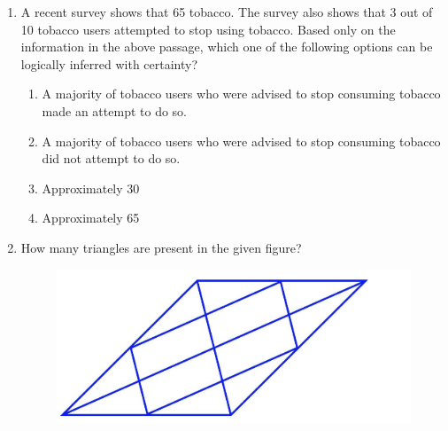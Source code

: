 \documentclass[12pt]{article}
\theoremstyle{remark}
\begin{document}
\begin{enumerate}
\begin{enumerate}
 \end{enumerate}
\hfill{}
\item A recent survey shows that 65%
tobacco. The survey also shows that 3 out of 10 tobacco users attempted to stop
using tobacco. 
Based only on the information in the above passage, which one of the following
options can be logically inferred with certainty? 
\begin{enumerate}
\item A majority of tobacco users who were advised to stop consuming tobacco made an
attempt to do so. 
\item A majority of tobacco users who were advised to stop consuming tobacco did not
attempt to do so. 
\item Approximately 30%
\item Approximately 65%
\end{enumerate}
\hfill{}
\newline
\item How many triangles are present in the given figure? 
\begin{centering}
\begin{figure}[H] 
\includegraphics{Figs/Q5.png}
\caption{}
\label{Fig:1.1} 
\end{figure}
\end{centering}
\begin{enumerate} 
\end{enumerate}
\end{enumerate}
\end{document}

